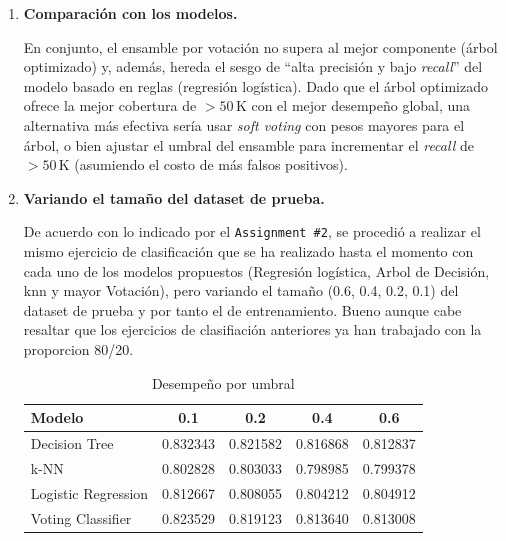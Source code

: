 \documentclass[12pt,a4paper]{article}
\begin{document}
\begin{enumerate}
      \item \textbf{Comparación con los modelos.}
      
      En conjunto, el ensamble por votación no supera al mejor componente (árbol optimizado) y, además, hereda el sesgo de ``alta precisión y 
      bajo \textit{recall}'' del modelo basado en reglas (regresión logística). Dado que el árbol optimizado ofrece la mejor cobertura de \(>50\,\text{K}\) con el 
      mejor desempeño global, una alternativa más efectiva sería usar \textit{soft voting} con pesos mayores para el árbol, o bien ajustar el umbral 
      del ensamble para incrementar el \textit{recall} de \(>50\,\text{K}\) (asumiendo el costo de más falsos positivos).

      \item \textbf{Variando el tamaño del dataset de prueba.}
      
      De acuerdo con lo indicado por el \texttt{Assignment \#2}, se procedió a realizar el mismo ejercicio de clasificación que se ha realizado 
      hasta el momento con cada uno de los modelos propuestos (Regresión logística, Arbol de Decisión, knn y mayor Votación), pero variando el tamaño 
      (0.6, 0.4, 0.2, 0.1) del dataset de prueba y por tanto el de entrenamiento. Bueno aunque cabe resaltar que los ejercicios de clasifiación anteriores 
      ya han trabajado con la proporcion 80/20.

      \begin{table}[htbp]
        \centering
          \begin{tabular}{lcccc}
          \hline
          \textbf{Modelo} & \textbf{0.1} & \textbf{0.2} & \textbf{0.4} & \textbf{0.6} \\
          \hline
          Decision Tree        & 0.832343 & 0.821582 & 0.816868 & 0.812837 \\
          k-NN                 & 0.802828 & 0.803033 & 0.798985 & 0.799378 \\
          Logistic Regression  & 0.812667 & 0.808055 & 0.804212 & 0.804912 \\
          Voting Classifier    & 0.823529 & 0.819123 & 0.813640 & 0.813008 \\
          \hline
          \end{tabular}
        \caption{Desempeño por umbral}
        \label{tab:desempeno-umbrales}
      \end{table}


\end{enumerate}
\end{document}
